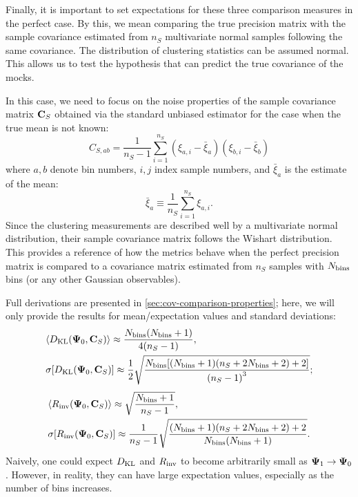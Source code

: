 Finally, it is important to set expectations for these three comparison measures in the perfect case.
By this, we mean comparing the true precision matrix with the sample covariance estimated from $n_S$ multivariate normal samples following the same covariance.
The distribution of clustering statistics can be assumed normal.
This allows us to test the hypothesis that \rascalc{} can predict the true covariance of the mocks.

In this case, we need to focus on the noise properties of the sample covariance matrix ${\bf C}_S$ obtained via the standard unbiased estimator for the case when the true mean is not known:
\begin{equation} \label{eq:sample-cov}
C_{S,ab} = \frac1{n_S-1} \sum_{i=1}^{n_S} (\xi_{a,i} - \bar \xi_a) (\xi_{b,i} - \bar \xi_b)
\end{equation}
where $a,b$ denote bin numbers, $i,j$ index sample numbers, and $\bar \xi_a$ is the estimate of the mean:
\begin{equation}
\bar \xi_a \equiv \frac1{n_S} \sum_{i=1}^{n_S} \xi_{a,i}.
\end{equation}
Since the clustering measurements are described well by a multivariate normal distribution, their sample covariance matrix follows the Wishart distribution.
This provides a reference of how the metrics behave when the perfect precision matrix is compared to a covariance matrix estimated from $n_S$ samples with $N_{\rm bins}$ bins (or any other Gaussian observables).

Full derivations are presented in \cref{sec:cov-comparison-properties}; here, we will only provide the results for mean/expectation values and standard deviations:
\begin{align} \label{eq:D_KL-stats}
& {\left\langle D_{\rm KL} {\left( {\bf \Psi}_0, {\bf C}_S \right)} \right\rangle} \approx \frac{N_{\rm bins}(N_{\rm bins}+1)}{4(n_S-1)}, \nonumber \\
& \sigma {\left[ D_{\rm KL} {\left( {\bf \Psi}_0, {\bf C}_S \right)} \right]} \approx \frac12 \sqrt{\frac{N_{\rm bins} [(N_{\rm bins} + 1) (n_S + 2 N_{\rm bins} + 2) + 2]}{{\left( n_S-1 \right)}^3}};
\end{align}
\begin{align} \label{eq:R_inv-stats}
& {\left\langle R_{\rm inv} {\left( {\bf \Psi}_0, {\bf C}_S \right)} \right\rangle} \approx \sqrt{\frac{N_{\rm bins}+1}{n_S-1}}, \nonumber \\
& \sigma {\left[ R_{\rm inv} {\left( {\bf \Psi}_0, {\bf C}_S \right)} \right]} \approx \frac1{n_S-1} \sqrt{\frac{(N_{\rm bins} + 1) (n_S + 2 N_{\rm bins} + 2) + 2}{N_{\rm bins} (N_{\rm bins}+1)}}.
\end{align}
Naively, one could expect $D_{\rm KL}$ and $R_{\rm inv}$ to become arbitrarily small as ${\bf \Psi}_1 \rightarrow {\bf \Psi}_0$.
However, in reality, they can have large expectation values, especially as the number of bins increases.

